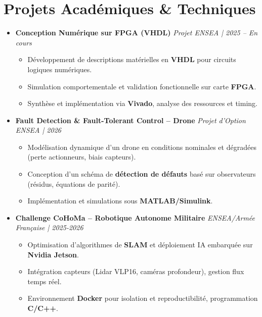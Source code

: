 \documentclass[a4paper,11pt]{article}
\begin{document}
\section{Projets Académiques \& Techniques}
\begin{itemize}[leftmargin=*, label={-}]

\item \textbf{Conception Numérique sur FPGA (VHDL)} \hfill \textit{Projet ENSEA | 2025 -- En cours}
\vspace{-2pt}
    \begin{itemize}[leftmargin=0.4cm, nosep, label=\tiny$\bullet$]
        \item \small{Développement de descriptions matérielles en \textbf{VHDL} pour circuits logiques numériques.}
        \item \small{Simulation comportementale et validation fonctionnelle sur carte \textbf{FPGA}.}
        \item \small{Synthèse et implémentation via \textbf{Vivado}, analyse des ressources et timing.}
    \end{itemize}
\vspace{3pt}

\item \textbf{Fault Detection \& Fault-Tolerant Control -- Drone} \hfill \textit{Projet d'Option ENSEA | 2026}
\vspace{-2pt}
    \begin{itemize}[leftmargin=0.4cm, nosep, label=\tiny$\bullet$]
        \item \small{Modélisation dynamique d'un drone en conditions nominales et dégradées (perte actionneurs, biais capteurs).}
        \item \small{Conception d'un schéma de \textbf{détection de défauts} basé sur observateurs (résidus, équations de parité).}
        \item \small{Implémentation et simulations sous \textbf{MATLAB/Simulink}.}
    \end{itemize}
\vspace{3pt}

\item \textbf{Challenge CoHoMa -- Robotique Autonome Militaire} \hfill \textit{ENSEA/Armée Française | 2025-2026}
\vspace{-2pt}
    \begin{itemize}[leftmargin=0.4cm, nosep, label=\tiny$\bullet$]
        \item \small{Optimisation d'algorithmes de \textbf{SLAM} et déploiement IA embarquée sur \textbf{Nvidia Jetson}.}
        \item \small{Intégration capteurs (Lidar VLP16, caméras profondeur), gestion flux temps réel.}
        \item \small{Environnement \textbf{Docker} pour isolation et reproductibilité, programmation \textbf{C/C++}.}
    \end{itemize}
\vspace{3pt}


\end{itemize}
\end{document}
